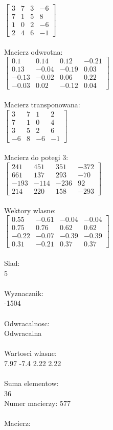 \documentclass[a4paper,12pt]{article}
\begin{document}
$\begin{bmatrix} 3&7&3&-6\\7&1&5&8\\1&0&2&-6\\2&4&6&-1 \end{bmatrix}$
\\
\\
Macierz odwrotna:\\

$\begin{bmatrix} 0.1&0.14&0.12&-0.21\\0.13&-0.04&-0.19&0.03\\-0.13&-0.02&0.06&0.22\\-0.03&0.02&-0.12&0.04 \end{bmatrix}$
\\
\\
Macierz transponowana:\\

$\begin{bmatrix} 3&7&1&2\\7&1&0&4\\3&5&2&6\\-6&8&-6&-1 \end{bmatrix}$
\\
\\
Macierz do potegi 3:\\

$\begin{bmatrix} 241&451&351&-372\\661&137&293&-70\\-193&-114&-236&92\\214&220&158&-293 \end{bmatrix}$
\\
\\
Wektory wlasne:\\

$\begin{bmatrix} 0.55&-0.61&-0.04&-0.04\\0.75&0.76&0.62&0.62\\-0.22&-0.07&-0.39&-0.39\\0.31&-0.21&0.37&0.37 \end{bmatrix}$
\\
\\
Slad:\\
5
\\
\\
Wyznacznik:\\
-1504
\\
\\
Odwracalnosc:\\
Odwracalna
\\
\\
Wartosci wlasne:\\
7.97 -7.4 2.22 2.22
\\
\\
Suma elementow:\\
36
\\
\newpage
Numer macierzy:
577
\\
\\
Macierz:\\
\end{document}
